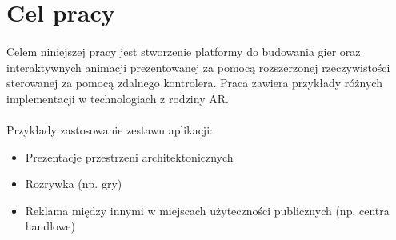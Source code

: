 \section{Cel pracy}
\paragraph{}
Celem niniejszej pracy jest stworzenie platformy do budowania gier oraz interaktywnych animacji prezentowanej za pomocą rozszerzonej rzeczywistości sterowanej za pomocą zdalnego kontrolera. Praca zawiera przykłady różnych implementacji w technologiach z rodziny AR.

\paragraph{}
Przykłady zastosowanie zestawu aplikacji:

\begin{itemize}
	\item Prezentacje przestrzeni architektonicznych
	\item Rozrywka (np. gry)
	\item Reklama między innymi w miejscach użyteczności publicznych (np. centra handlowe)
\end{itemize}
